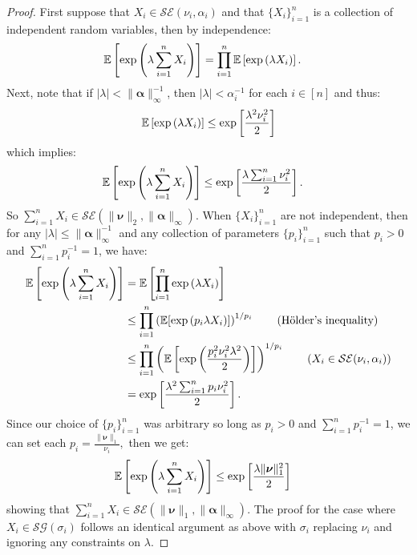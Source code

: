 \begin{proof}
First suppose that $X_i \in \mathcal{SE}(\nu_i, \alpha_i)$ and that $\{X_i\}_{i=1}^n$ is a collection of independent random variables, then by independence:
\begin{align*}
    \mathbb{E}\left[\exp\left(\lambda \sum_{i=1}^n X_i\right)\right] &=  \prod_{i=1}^n \mathbb{E}\left[\exp\left(\lambda X_i\right)\right].
\end{align*}
Next, note that if $|\lambda| < \lVert \boldsymbol{\alpha}\rVert^{-1}_{\infty}$, then $|\lambda| < \alpha_i^{-1}$ for each $i \in [n]$ and thus:
\begin{align*}
    \mathbb{E}\left[\exp\left(\lambda X_i\right)\right] \leq \exp\left[\frac{\lambda^2\nu_{i}^2}{2}\right]
\end{align*}
which implies:
\begin{align*}
    \mathbb{E}\left[\exp\left(\lambda \sum_{i=1}^n X_i\right)\right] &\leq \exp\left[\frac{\lambda\sum_{i=1}^n\nu^2_i}{2}\right].
\end{align*}
So $\sum_{i=1}^n X_i \in \mathcal{SE}(\lVert \boldsymbol{\nu}\rVert_2, \lVert \boldsymbol{\alpha}\rVert_\infty)$. When $\{X_i\}_{i=1}^n$ are not independent, then for any $|\lambda| \leq \lVert \boldsymbol{\alpha}\rVert^{-1}_{\infty}$ and any collection of parameters $\{p_i\}_{i=1}^n$ such that $p_i > 0$ and $\sum_{i=1}^n p_i^{-1} = 1$, we have:
\begin{align*}
    \E\left[\exp\left(\lambda \sum_{i=1}^n X_i\right)\right] &= \E\left[ \prod_{i=1}^n \exp\left(\lambda X_i\right)\right] \\
    &\leq \prod_{i=1}^n \left(\E[\exp\left(p_i \lambda X_i\right)]\right)^{1/p_i} \tag{H\"older's inequality} \\
    &\leq \prod_{i=1}^n \left(\E\left[\exp\left(\frac{p^2_i\nu_i^2 \lambda^2}{2}\right)\right]\right)^{1/p_i} \tag{$X_i \in \mathcal{SE}(\nu_i,\alpha_i)$} \\
    &= \exp\left[\frac{\lambda^2\sum_{i=1}^n p_i \nu_i^2}{2}\right].
\end{align*}
Since our choice of $\{p_i\}_{i=1}^n$ was arbitrary so long as $p_i > 0$ and $\sum_{i=1}^n p_i^{-1} = 1$, we can set each $p_i = \frac{\lVert\boldsymbol{\nu}\rVert_1}{\nu_i},$ then we get:
\begin{align*}
    \mathbb{E}\left[\exp\left(\lambda \sum_{i=1}^n X_i\right)\right] &\leq \exp\left[\frac{\lambda \lVert \boldsymbol{\nu}\rVert^2_1}{2}\right]
\end{align*}
showing that $\sum_{i=1}^n X_i \in \mathcal{SE}(\lVert\boldsymbol{\nu}\rVert_1, \lVert \boldsymbol{\alpha}\rVert_\infty).$ The proof for the case where $X_i \in \mathcal{SG}(\sigma_i)$ follows an identical argument as above with $\sigma_i$ replacing $\nu_i$ and ignoring any constraints on $\lambda$. 

\end{proof}

